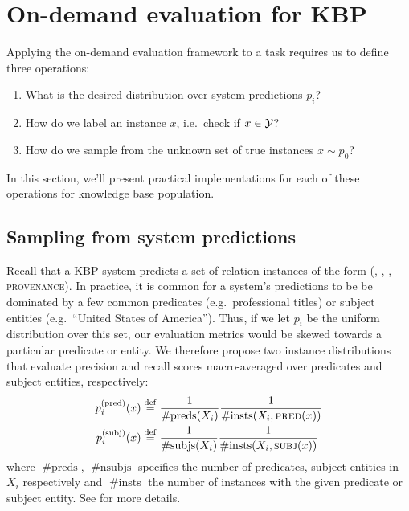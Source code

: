 \section{On-demand evaluation for KBP}
\label{sec:application}
Applying the on-demand evaluation framework to a task requires us to define three operations:
\begin{enumerate}
  \item What is the desired distribution over system predictions $p_i$?
  \item How do we label an instance $x$, i.e.\ check if $x \in \mathcal{Y}$?
  \item How do we sample from the unknown set of true instances $x \sim p_0$?
\end{enumerate}
In this section, we'll present practical implementations for each of these operations for knowledge base population.

\subsection{Sampling from system predictions}
Recall that a KBP system predicts a set of relation instances of the form (, , , \textsc{provenance}).
In practice, it is common for a system's predictions
to be be dominated by a few common predicates (e.g.\ professional titles) or
subject entities (e.g.\ ``United States of America'').
Thus, if we let $p_i$ be the uniform distribution over this set,
our evaluation metrics would be skewed towards a particular predicate or entity.
We therefore propose two instance distributions that evaluate precision and recall scores macro-averaged over predicates and subject entities, respectively:
\begin{align*}
  p_i^\text{(pred)}(x) &\stackrel{\rm def}{=} \frac{1}{\operatorname{\#preds}(X_i)} \frac{1}{\operatorname{\#insts}(X_i, {\textsc{pred}}(x))} \\
  p_i^\text{(subj)}(x) &\stackrel{\rm def}{=} \frac{1}{\operatorname{\#subjs}(X_i)} \frac{1}{\operatorname{\#insts}(X_i, {\textsc{subj}}(x))}
\end{align*}
where $\operatorname{\#preds}$, $\operatorname{\#nsubjs}$ specifies the number of predicates, subject entities in $X_i$ respectively and $\operatorname{\#insts}$ the number of instances with the given predicate or subject entity.
See  for more details.

